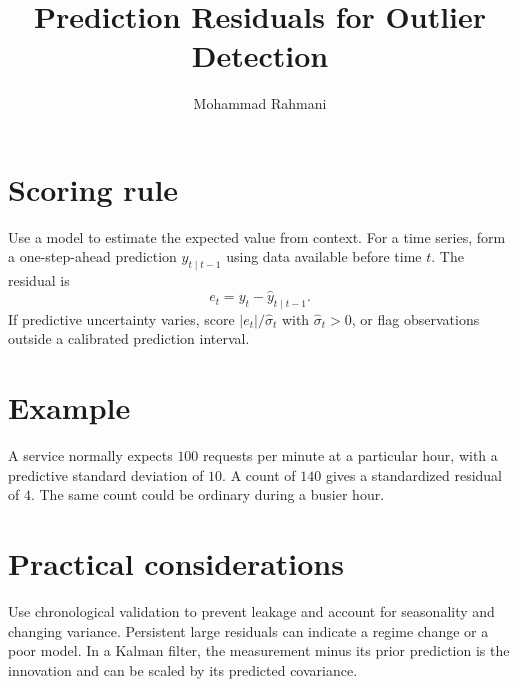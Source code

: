 \documentclass[a4paper]{article}
\title{Prediction Residuals for Outlier Detection}
\date{}
\author{Mohammad Rahmani}
\begin{document}
   \maketitle

\section{Scoring rule}
Use a model to estimate the expected value from context. For a time series, form a one-step-ahead prediction \(\hat y_{t\mid t-1}\) using data available before time \(t\). The residual is
\[
e_t=y_t-\hat y_{t\mid t-1}.
\]
If predictive uncertainty varies, score \(|e_t|/\hat\sigma_t\) with \(\hat\sigma_t>0\), or flag observations outside a calibrated prediction interval.

\section{Example}
A service normally expects \(100\) requests per minute at a particular hour, with a predictive standard deviation of \(10\). A count of \(140\) gives a standardized residual of \(4\). The same count could be ordinary during a busier hour.

\section{Practical considerations}
Use chronological validation to prevent leakage and account for seasonality and changing variance. Persistent large residuals can indicate a regime change or a poor model. In a Kalman filter, the measurement minus its prior prediction is the innovation and can be scaled by its predicted covariance.



   
   
\end{document}

